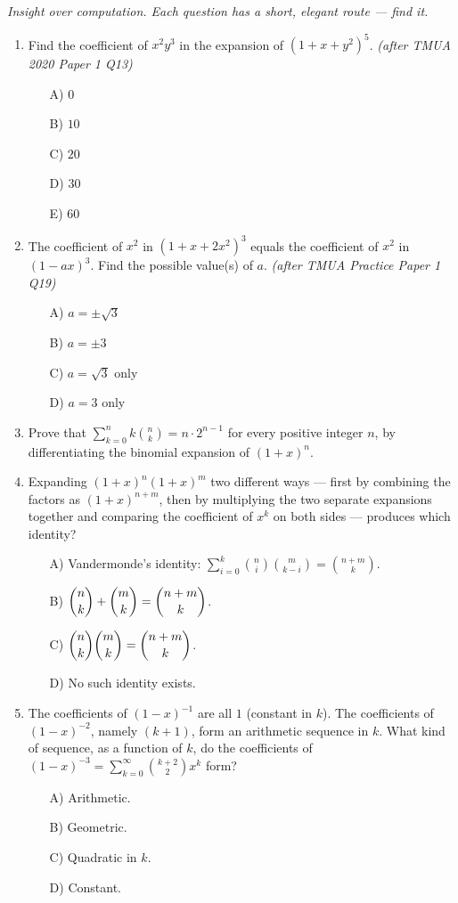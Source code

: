 \documentclass[11pt,a4paper]{article}
\begin{document}
\noindent\textit{Insight over computation. Each question has a short, elegant route --- find it.}

\begin{enumerate}

\item Find the coefficient of $x^2y^3$ in the expansion of $(1+x+y^2)^5$. \textit{\small(after TMUA 2020 Paper 1 Q13)}
\begin{itemize}
\item[A)] $0$
\item[B)] $10$
\item[C)] $20$
\item[D)] $30$
\item[E)] $60$
\end{itemize}

\item The coefficient of $x^2$ in $(1+x+2x^2)^3$ equals the coefficient of $x^2$ in $(1-ax)^3$. Find the possible value(s) of $a$. \textit{\small(after TMUA Practice Paper 1 Q19)}
\begin{itemize}
\item[A)] $a=\pm\sqrt3$
\item[B)] $a=\pm3$
\item[C)] $a=\sqrt3$ only
\item[D)] $a=3$ only
\end{itemize}

\item Prove that $\displaystyle\sum_{k=0}^n k\binom nk=n\cdot2^{n-1}$ for every positive integer $n$, by differentiating the binomial expansion of $(1+x)^n$.

\item Expanding $(1+x)^n(1+x)^m$ two different ways --- first by combining the factors as $(1+x)^{n+m}$, then by multiplying the two separate expansions together and comparing the coefficient of $x^k$ on both sides --- produces which identity?
\begin{itemize}
\item[A)] Vandermonde's identity: $\displaystyle\sum_{i=0}^k\binom ni\binom m{k-i}=\binom{n+m}k$.
\item[B)] $\dbinom nk+\dbinom mk=\dbinom{n+m}k$.
\item[C)] $\dbinom nk\dbinom mk=\dbinom{n+m}k$.
\item[D)] No such identity exists.
\end{itemize}

\item The coefficients of $(1-x)^{-1}$ are all $1$ (constant in $k$). The coefficients of $(1-x)^{-2}$, namely $(k+1)$, form an arithmetic sequence in $k$. What kind of sequence, as a function of $k$, do the coefficients of $(1-x)^{-3}=\sum_{k=0}^\infty\binom{k+2}2x^k$ form?
\begin{itemize}
\item[A)] Arithmetic.
\item[B)] Geometric.
\item[C)] Quadratic in $k$.
\item[D)] Constant.
\end{itemize}

\end{enumerate}

\end{document}
